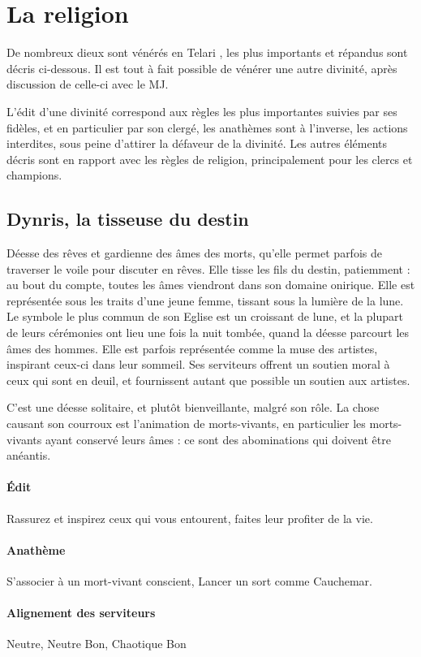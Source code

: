 \documentclass[10pt,a4paper]{book}
\newcommand{\nomorigine}{Telari }
\begin{document}
\section{La religion}
De nombreux dieux sont vénérés en \nomorigine, les plus importants et répandus sont décris ci-dessous. Il est tout à fait possible de vénérer une autre divinité, après discussion de celle-ci avec le MJ.

L'édit d'une divinité correspond aux règles les plus importantes suivies par ses fidèles, et en particulier par son clergé, les anathèmes sont à l'inverse, les actions interdites, sous peine d'attirer la défaveur de la divinité. Les autres éléments décris sont en rapport avec les règles de religion, principalement pour les clercs et champions.
\subsection{Dynris, la tisseuse du destin}
Déesse des rêves et gardienne des âmes des morts, qu'elle permet parfois de traverser le voile pour discuter en rêves. Elle tisse les fils du destin, patiemment : au bout du compte, toutes les âmes viendront dans son domaine onirique. Elle est représentée sous les traits d'une jeune femme, tissant sous la lumière de la lune. Le symbole le plus commun de son Eglise est un croissant de lune, et la plupart de leurs cérémonies ont lieu une fois la nuit tombée, quand la déesse parcourt les âmes des hommes. Elle est parfois représentée comme la muse des artistes, inspirant ceux-ci dans leur sommeil. Ses serviteurs offrent un soutien moral à ceux qui sont en deuil, et fournissent autant que possible un soutien aux artistes.

C'est une déesse solitaire, et plutôt bienveillante, malgré son rôle. La chose causant son courroux est l'animation de morts-vivants, en particulier les morts-vivants ayant conservé leurs âmes : ce sont des abominations qui doivent être anéantis.
\paragraph{Édit} Rassurez et inspirez ceux qui vous entourent, faites leur profiter de la vie.
\paragraph{Anathème}S'associer à un mort-vivant conscient, Lancer un sort comme Cauchemar.
\paragraph{Alignement des serviteurs} Neutre, Neutre Bon, Chaotique Bon
\end{document}
